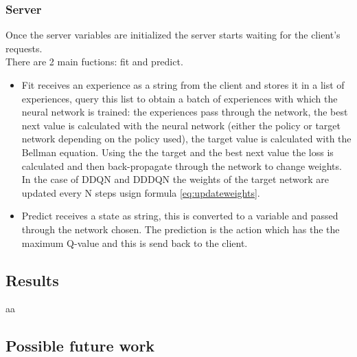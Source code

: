 \documentclass[14pt]{extarticle}
\def\sp{\vspace{5pt}}
\begin{document}
\begin{flushleft}
\subsubsection{Server}
Once the server variables are initialized the server starts waiting for the client's requests. \\
There are 2 main fuctions: fit and predict.
\begin{itemize}
\item Fit receives an experience as a string from the client and stores it in a list of experiences, query this list to obtain a batch of experiences with which the neural network is trained: the experiences pass through the network, the best next value is calculated with the neural network (either the policy or target network depending on the policy used), the target value is calculated with the Bellman equation. Using the the target and the best next value the loss is calculated and then back-propagate through the network to change weights. \\
In the case of DDQN and DDDQN the weights of the target network are updated every N steps usign formula \ref{eq:updateweights}.
\item Predict receives a state as string, this is converted to a variable and passed through the network chosen. The prediction is the action which has the the maximum Q-value and this is send back to the client.
\end{itemize}

\end{flushleft}

\newpage
\begin{center}
	\section{Results}
	\sp
\end{center}

\begin{flushleft}
aa

\subsection{Possible future work}

\end{flushleft}
\end{document}
